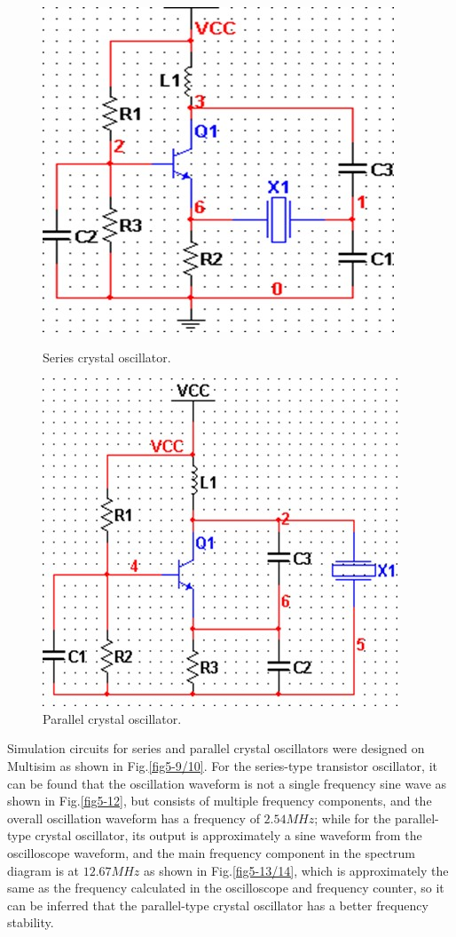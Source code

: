 \documentclass[conference]{IEEEtran}
\begin{document}
\begin{figure}[!h]
	\centering
	\begin{minipage}{0.49\linewidth}
		\centering
		\includegraphics[width=0.72\linewidth]{fig/pic5-7.jpg}
		\caption{Series crystal oscillator.}
		\label{fig5-7}%
	\end{minipage}
	\begin{minipage}{0.49\linewidth}
		\centering
		\includegraphics[width=0.72\linewidth]{fig/pic5-8.jpg}
		\caption{Parallel crystal oscillator.}
		\label{fig5-8}%
	\end{minipage}
\end{figure}

Simulation circuits for series and parallel crystal oscillators were designed on Multisim as shown in Fig.\ref{fig5-9/10}. For the series-type transistor oscillator, it can be found that the oscillation waveform is not a single frequency sine wave as shown in Fig.\ref{fig5-12}, but consists of multiple frequency components, and the overall oscillation waveform has a frequency of $2.54MHz$; while for the parallel-type crystal oscillator, its output is approximately a sine waveform from the oscilloscope waveform, and the main frequency component in the spectrum diagram is at $12.67 MHz$ as shown in Fig.\ref{fig5-13/14}, which is approximately the same as the frequency calculated in the oscilloscope and frequency counter, so it can be inferred that the parallel-type crystal oscillator has a better frequency stability.
\end{document}
